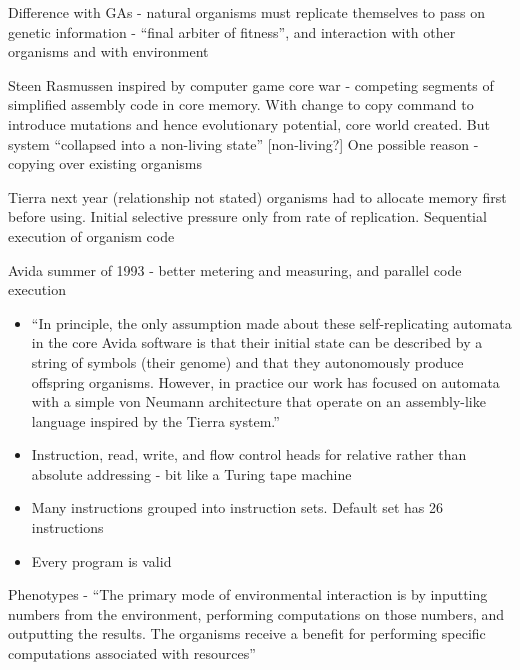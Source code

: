 Difference with GAs - natural organisms must replicate themselves to
pass on genetic information - ``final arbiter of fitness'', and
interaction with other organisms and with environment

Steen Rasmussen inspired by computer game core war - competing
segments of simplified assembly code in core memory. With change to
copy command to introduce mutations and hence evolutionary potential,
core world created. But system ``collapsed into a non-living state''
{[}non-living?{]} One possible reason - copying over existing
organisms

Tierra next year (relationship not stated) organisms had to allocate
memory first before using. Initial selective pressure only from rate
of replication. Sequential execution of organism code


Avida summer of 1993 - better metering and measuring, and parallel
code execution


\begin{itemize}
	\item
	
	``In principle, the only assumption made about these
	self-replicating automata in the core Avida software is that their
	initial state can be described by a string of symbols (their genome)
	and that they autonomously produce offspring organisms. However, in
	practice our work has focused on automata with a simple von Neumann
	architecture that operate on an assembly-like language inspired by
	the Tierra system.''
	
	\item
	
	Instruction, read, write, and flow control heads for relative rather
	than absolute addressing - bit like a Turing tape machine
	
	\item
	
	Many instructions grouped into instruction sets. Default set has 26
	instructions
	
	\item
	
	Every program is valid
	
\end{itemize}


Phenotypes - ``The primary mode of environmental interaction is by
inputting numbers from the environment, performing computations on
those numbers, and outputting the results. The organisms receive a
benefit for performing specific computations associated with
resources''

